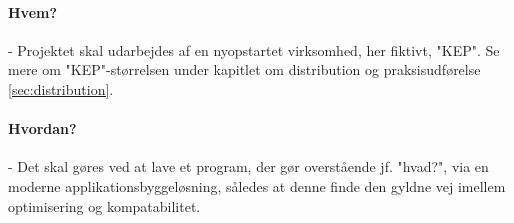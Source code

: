 \paragraph{Hvem?} - Projektet skal udarbejdes af en nyopstartet virksomhed, her fiktivt, "KEP". Se mere om "KEP"-størrelsen under kapitlet om distribution og praksisudførelse \ref{sec:distribution}.
\paragraph{Hvordan?} - Det skal gøres ved at lave et program, der gør overstående jf. "hvad?", via en moderne applikationsbyggeløsning, således at denne finde den gyldne vej imellem optimisering og kompatabilitet.
